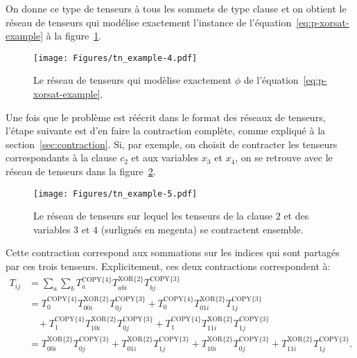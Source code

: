 On donne ce type de tenseurs à tous les sommets de type clause et on obtient le réseau de tenseurs qui modélise exactement l'instance de l'équation~\ref{eq:p-xorsat-example} à la figure~\ref{fig:tn-example4}.
\begin{figure}[h]
    \centering
    \texttt{[image: Figures/tn\_example-4.pdf]}
    \caption{Le réseau de tenseurs qui modèlise exactement $\phi$ de l'équation~\ref{eq:p-xorsat-example}.}
    \label{fig:tn-example4}
\end{figure}

Une fois que le problème est réécrit dans le format des réseaux de tenseurs, l'étape suivante est d'en faire la contraction complète, comme expliqué à la section~\ref{sec:contraction}.
Si, par exemple, on choisit de contracter les tenseurs correspondants à la clause $c_2$ et aux variables $x_3$ et $x_4$, on se retrouve avec le réseau de tenseurs dans la figure~\ref{fig:tn-example5}.
\begin{figure}[h]
    \centering
    \texttt{[image: Figures/tn\_example-5.pdf]}
    \caption{Le réseau de tenseurs sur lequel les tenseurs de la clause $2$ et des variables $3$ et $4$ (surlignés en megenta) se contractent ensemble.}
    \label{fig:tn-example5}
\end{figure}
Cette contraction correspond aux sommations sur les indices qui sont partagés par ces trois tenseurs.
Explicitement, ces deux contractions correspondent à:
\begin{equation}
    \begin{split}
        T_{ij} &= \sum_{a}\sum_{b}T^{\text{COPY}\{4\}}_{a} T^{\text{XOR}\{2\}}_{abi} T^{\text{COPY}\{3\}}_{bj}\\
        &= T^{\text{COPY}\{4\}}_{0} T^{\text{XOR}\{2\}}_{00i} T^{\text{COPY}\{3\}}_{0j} + T^{\text{COPY}\{4\}}_{0} T^{\text{XOR}\{2\}}_{01i} T^{\text{COPY}\{3\}}_{1j}\\
        &\ \ \ \ + T^{\text{COPY}\{4\}}_{1} T^{\text{XOR}\{2\}}_{10i} T^{\text{COPY}\{3\}}_{0j} + T^{\text{COPY}\{4\}}_{1} T^{\text{XOR}\{2\}}_{11i} T^{\text{COPY}\{3\}}_{1j}\\
        &= T^{\text{XOR}\{2\}}_{00i} T^{\text{COPY}\{3\}}_{0j} + T^{\text{XOR}\{2\}}_{01i} T^{\text{COPY}\{3\}}_{1j} + T^{\text{XOR}\{2\}}_{10i} T^{\text{COPY}\{3\}}_{0j} + T^{\text{XOR}\{2\}}_{11i} T^{\text{COPY}\{3\}}_{1j}.\\
    \end{split}
\end{equation}
